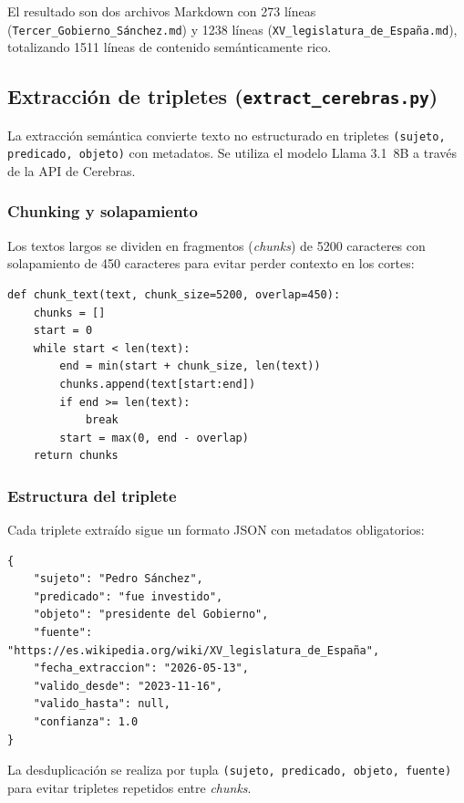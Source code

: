 \documentclass[12pt,a4paper]{article}
\begin{document}
El resultado son dos archivos Markdown con 273 líneas (\texttt{Tercer\_Gobierno\_Sánchez.md}) y 1238 líneas (\texttt{XV\_legislatura\_de\_España.md}), totalizando 1511 líneas de contenido semánticamente rico.

\subsection{Extracción de tripletes (\texttt{extract\_cerebras.py})}

La extracción semántica convierte texto no estructurado en tripletes \texttt{(sujeto, predicado, objeto)} con metadatos. Se utiliza el modelo Llama 3.1~8B a través de la API de Cerebras.

\subsubsection*{Chunking y solapamiento}

Los textos largos se dividen en fragmentos (\textit{chunks}) de 5200 caracteres con solapamiento de 450 caracteres para evitar perder contexto en los cortes:

\begin{lstlisting}[caption={Estrategia de chunking con solapamiento}, label={lst:chunking}]
def chunk_text(text, chunk_size=5200, overlap=450):
    chunks = []
    start = 0
    while start < len(text):
        end = min(start + chunk_size, len(text))
        chunks.append(text[start:end])
        if end >= len(text):
            break
        start = max(0, end - overlap)
    return chunks
\end{lstlisting}

\subsubsection*{Estructura del triplete}

Cada triplete extraído sigue un formato JSON con metadatos obligatorios:

\begin{lstlisting}[caption={Estructura de un triplete}, label={lst:triplete}]
{
    "sujeto": "Pedro Sánchez",
    "predicado": "fue investido",
    "objeto": "presidente del Gobierno",
    "fuente": "https://es.wikipedia.org/wiki/XV_legislatura_de_España",
    "fecha_extraccion": "2026-05-13",
    "valido_desde": "2023-11-16",
    "valido_hasta": null,
    "confianza": 1.0
}
\end{lstlisting}

La desduplicación se realiza por tupla \texttt{(sujeto, predicado, objeto, fuente)} para evitar tripletes repetidos entre \textit{chunks}.
\end{document}
